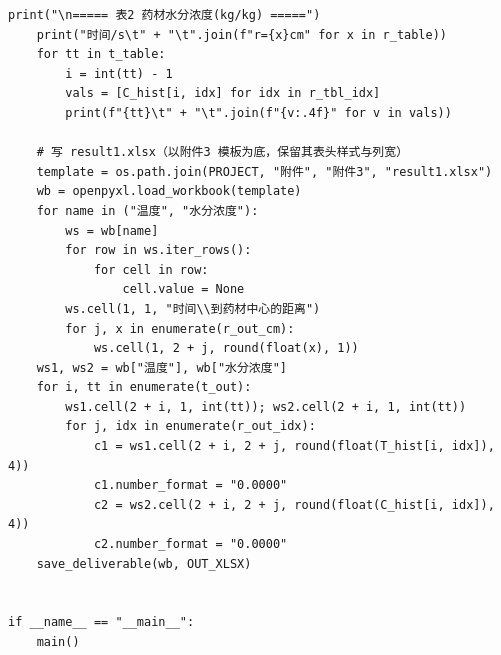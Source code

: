 \documentclass[12pt,a4paper]{ctexart}
\begin{document}
\begin{lstlisting}[caption={solve\_problem1.py }]
    print("\n===== 表2 药材水分浓度(kg/kg) =====")
    print("时间/s\t" + "\t".join(f"r={x}cm" for x in r_table))
    for tt in t_table:
        i = int(tt) - 1
        vals = [C_hist[i, idx] for idx in r_tbl_idx]
        print(f"{tt}\t" + "\t".join(f"{v:.4f}" for v in vals))

    # 写 result1.xlsx（以附件3 模板为底，保留其表头样式与列宽）
    template = os.path.join(PROJECT, "附件", "附件3", "result1.xlsx")
    wb = openpyxl.load_workbook(template)
    for name in ("温度", "水分浓度"):
        ws = wb[name]
        for row in ws.iter_rows():
            for cell in row:
                cell.value = None
        ws.cell(1, 1, "时间\\到药材中心的距离")
        for j, x in enumerate(r_out_cm):
            ws.cell(1, 2 + j, round(float(x), 1))
    ws1, ws2 = wb["温度"], wb["水分浓度"]
    for i, tt in enumerate(t_out):
        ws1.cell(2 + i, 1, int(tt)); ws2.cell(2 + i, 1, int(tt))
        for j, idx in enumerate(r_out_idx):
            c1 = ws1.cell(2 + i, 2 + j, round(float(T_hist[i, idx]), 4))
            c1.number_format = "0.0000"
            c2 = ws2.cell(2 + i, 2 + j, round(float(C_hist[i, idx]), 4))
            c2.number_format = "0.0000"
    save_deliverable(wb, OUT_XLSX)


if __name__ == "__main__":
    main()
\end{lstlisting}
\end{document}
